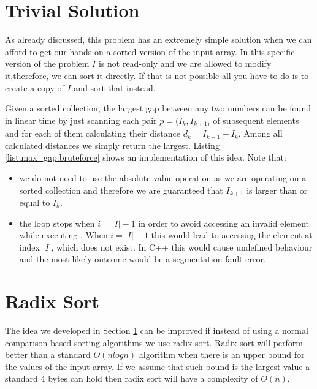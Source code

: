 

\section{Trivial Solution}
\label{max_gap:sec:trivial}
As already discussed, this problem has an extremely simple solution when we can
afford to get our hands on a sorted version of the input array. In this specific version of the
problem $I$ is not read-only and we are allowed to modify it,therefore, we can sort it directly. If
that is not possible all you have to do is to create a copy of $I$ and sort that instead. 

Given a sorted collection, the largest gap between any two numbers can be found in linear time by
just scanning each pair $p=(I_k, I_{k+1)}$ of subsequent elements and for each of them calculating
their distance $d_k=I_{k-1}-I_k$. Among all calculated distances we simply return the largest. Listing
\ref{list:max_gap:bruteforce} shows an implementation of this idea. Note that:
\begin{itemize}
	\item we do not need to use the absolute value operation as we are operating on a sorted
	collection and therefore we are guaranteed that $I_{k+1}$ is larger than  or equal to $I_k$.
	\item the  loop stops when $i=|I|-1$ in order to avoid accessing an invalid element
	while executing . When $i=|I|-1$ this would lead to accessing the element at
	index $|I|$, which does not exist. In C++ this would cause undefined behaviour and the most
	likely outcome would be a segmentation fault error.
\end{itemize}




\section{Radix Sort}
\label{max_gap:sec:radix_sort}
The idea we developed in Section \ref{max_gap:sec:trivial} can be improved if instead of using a
normal comparison-based sorting algorithms  we use radix-sort\cite{cit::wiki::radix_sort }.
Radix sort will perform better than a standard $O(nlogn)$ algorithm when there is an upper bound for
the values of the input array. If we assume that such bound is the largest value a standard 4 bytes
 can hold then radix sort will have a complexity of $O(n)$.

